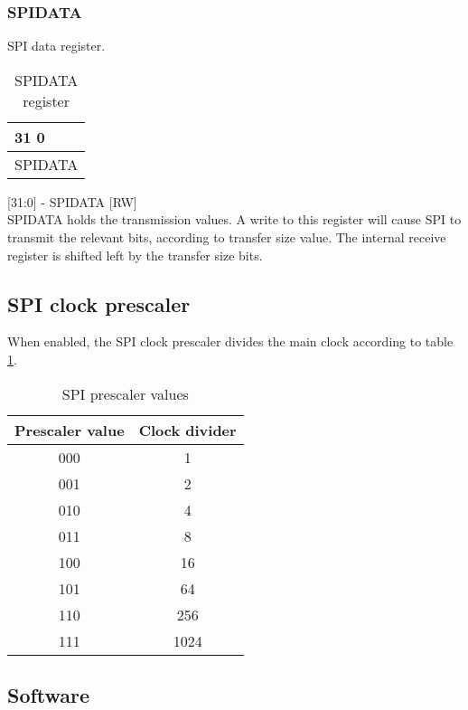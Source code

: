 \subsubsection{SPIDATA}
SPI data register.

\begin{table}[H]
\begin{center}
\begin{tabularx}{14cm}{X}
31 \hfill 0 \\

\hline
\multicolumn{1}{|c|}{SPIDATA} \\

\hline
\end{tabularx}
\caption{SPIDATA register}
\end{center}
\end{table}

\begin{description}
\item{[31:0] - SPIDATA [RW]} \hfill \\ SPIDATA holds the transmission values. A write to this register will cause SPI to transmit the relevant bits, according to transfer size value.
The internal receive register is shifted left by the transfer size bits.
\end{description}





\subsection{SPI clock prescaler}
When enabled, the SPI clock prescaler divides the main clock according to table \ref{spiprescaler}.

\begin{table}[H]
\begin{center}
\begin{tabularx}{6cm}{|c|c|}
\hline
Prescaler value & Clock divider \\
\hline
000 & 1 \\
\hline
001 & 2 \\
\hline
010 & 4 \\
\hline
011 & 8 \\
\hline  
100 & 16  \\
\hline
101 & 64  \\
\hline
110 & 256 \\
\hline
111 & 1024 \\
\hline
\end{tabularx}
\caption{SPI prescaler values}\label{spiprescaler}
\end{center}
\end{table}



\subsection{Software}
